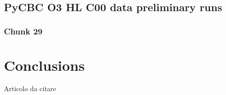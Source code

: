\documentclass[binding=0.6cm, LaM]{sapthesis}
\begin{document}
\section{PyCBC O3 HL C00 data preliminary runs}

\subsection{Chunk 29}

\chapter{Conclusions}

\cite[]{1}
\backmatter
\cleardoublepage


\begin{thebibliography}{100}
    Articolo da citare
\end{thebibliography}

\printbibliography
\end{document}
